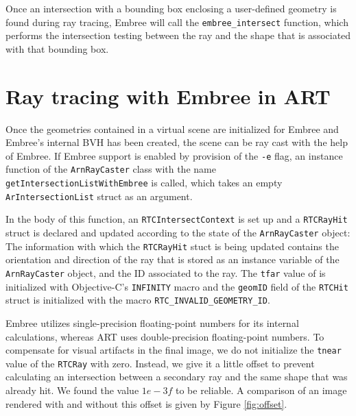 Once an intersection with a bounding box enclosing a user-defined geometry is found during ray tracing, Embree will call the \texttt{embree\_intersect} function, which performs the intersection testing between the ray and the shape that is associated with that bounding box.


\section{Ray tracing with Embree in ART}
\label{sec:embree_raycasting}

Once the geometries contained in a virtual scene are initialized for Embree and Embree's internal BVH has been created, the scene can be ray cast with the help of Embree. If Embree support is enabled by provision of the \texttt{-e} flag, an instance function of the \texttt{ArnRayCaster} class with the name \texttt{getIntersectionListWithEmbree} is called, which takes an empty \texttt{ArIntersectionList} struct as an argument.

In the body of this function, an \texttt{RTCIntersectContext} is set up and a \texttt{RTCRayHit} struct is declared and updated according to the state of the \texttt{ArnRayCaster} object: The information with which the \texttt{RTCRayHit} stuct is being updated contains the orientation and direction of the ray that is stored as an instance variable of the \texttt{ArnRayCaster} object, and the ID associated to the ray. The \texttt{tfar} value of is initialized with Objective-C's \texttt{INFINITY} macro and the \texttt{geomID} field of the \texttt{RTCHit} struct is initialized with the macro \texttt{RTC\_INVALID\_GEOMETRY\_ID}. 

Embree utilizes single-precision floating-point numbers for its internal calculations, whereas ART uses double-precision floating-point numbers. To compensate for visual artifacts in the final image, we do not initialize the \texttt{tnear} value of the \texttt{RTCRay} with zero. Instead, we give it a little offset to prevent calculating an intersection between a secondary ray and the same shape that was already hit. We found the value $1e-3f$ to be reliable. A comparison of an image rendered with and without this offset is given by Figure \ref{fig:offset}.

